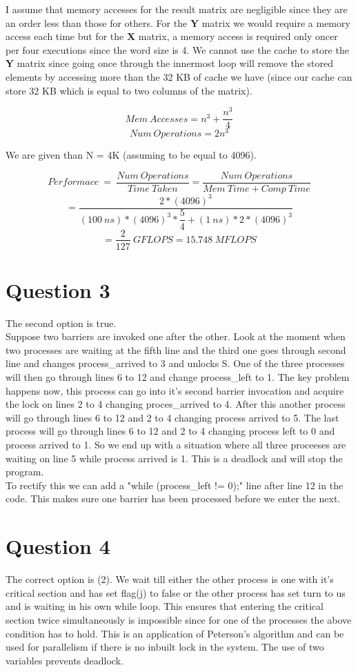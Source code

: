 \documentclass[11pt,a4paper]{article}
\begin{document}
I assume that memory accesses for the result matrix are negligible since they are an order less than those for others. For the \textbf{Y} matrix we would require a memory access each time but for the \textbf{X} matrix, a memory access is required only oncer per four executions since the word size is 4. We cannot use the cache to store the \textbf{Y} matrix  since going once through the innermost loop will remove the stored elements by accessing more than the 32 KB of cache we have (since our cache can store 32 KB which is equal to two columns of the matrix). 

$$ Mem\:Accesses =  n^{3} + \dfrac{n^{3}}{4} $$
$$ Num\:Operations = 2n^3$$

We are given than N = 4K (assuming to be equal to 4096).

$$Performace\:=\:\dfrac{Num\:Operations}{Time\:Taken}=\dfrac{Num\:Operations}{Mem\:Time+Comp\:Time}$$
$$ = \dfrac{2*(4096)^3}{(100\:ns)*(4096)^3*\dfrac{5}{4}+(1\:ns)*2*(4096)^3} $$ 
$$= \dfrac{2}{127}\:GFLOPS = 15.748 \:MFLOPS$$

\section{Question 3}

The second option is true.\\

Suppose two barriers are invoked one after the other. Look at the moment when two processes are waiting at the fifth line and the third one goes through second line and changes process\_arrived to 3 and unlocks S. One of the three processes will then go through lines 6 to 12  and change process\_left to 1. The key problem happens now, this process can go into it's second barrier invocation and acquire the lock on lines 2 to 4 changing proces\_arrived to 4. After this another process will go through lines 6 to 12 and 2 to 4 changing process arrived to 5. The last process will go through lines 6 to 12 and 2 to 4 changing process left to 0 and process arrived to 1. So we end up with a situation where all three proceeses are waiting on line 5 while process arrived is 1. This is a deadlock and will stop the program.\\

To rectify this we can add a "while (process\_left != 0);" line after line 12 in the code. This makes sure one barrier has been processed before we enter the next.
\section{Question 4}
The correct option is (2). We wait till either the other process is one with it's critical section and has set flag(j) to false or the other process has set turn to us and is waiting in his own while loop. This ensures that entering the critical section twice simultaneously is impossible since for one of the processes the above condition has to hold. This is an application of Peterson's algorithm and can be used for parallelism if there is no inbuilt lock in the system. The use of two variables prevents deadlock. 
\end{document}
